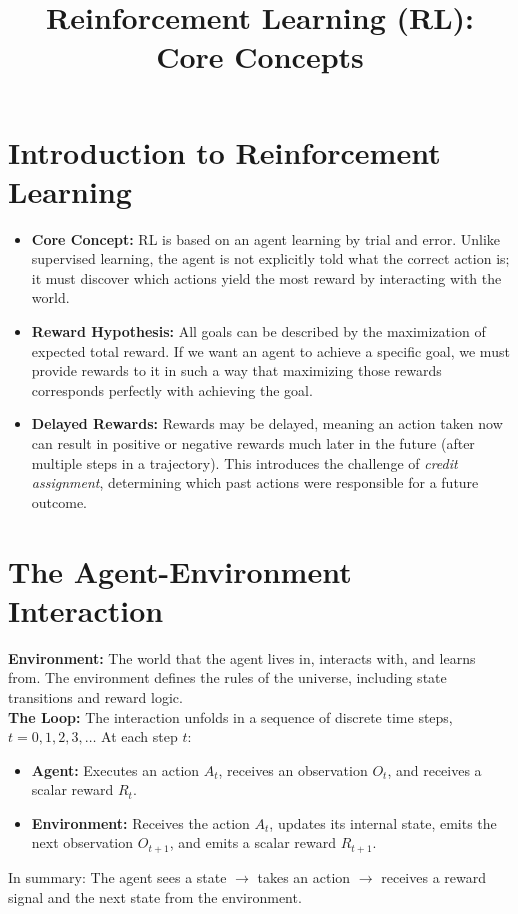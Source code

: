 \documentclass[12pt]{article}
\title{\textbf{Reinforcement Learning (RL): Core Concepts}}
\author{}
\date{}
\begin{document}
\maketitle
\vspace{-1.5cm}

\section*{Introduction to Reinforcement Learning}
\begin{itemize}[label=$\bullet$]
    \item \textbf{Core Concept:} RL is based on an agent learning by trial and error. Unlike supervised learning, the agent is not explicitly told what the correct action is; it must discover which actions yield the most reward by interacting with the world.
    \item \textbf{Reward Hypothesis:} All goals can be described by the maximization of expected total reward. If we want an agent to achieve a specific goal, we must provide rewards to it in such a way that maximizing those rewards corresponds perfectly with achieving the goal.
    \item \textbf{Delayed Rewards:} Rewards may be delayed, meaning an action taken now can result in positive or negative rewards much later in the future (after multiple steps in a trajectory). This introduces the challenge of \textit{credit assignment}, determining which past actions were responsible for a future outcome.
\end{itemize}

\section*{The Agent-Environment Interaction}
\noindent\textbf{Environment:} The world that the agent lives in, interacts with, and learns from. The environment defines the rules of the universe, including state transitions and reward logic. \\
\textbf{The Loop:} The interaction unfolds in a sequence of discrete time steps, $t = 0, 1, 2, 3, \dots$ At each step $t$:
\begin{itemize}[label=$\bullet$]
    \item \textbf{Agent:} Executes an action $A_t$, receives an observation $O_t$, and receives a scalar reward $R_t$.
    \item \textbf{Environment:} Receives the action $A_t$, updates its internal state, emits the next observation $O_{t+1}$, and emits a scalar reward $R_{t+1}$.
\end{itemize}
In summary: The agent sees a state $\rightarrow$ takes an action $\rightarrow$ receives a reward signal and the next state from the environment.
\end{document}
